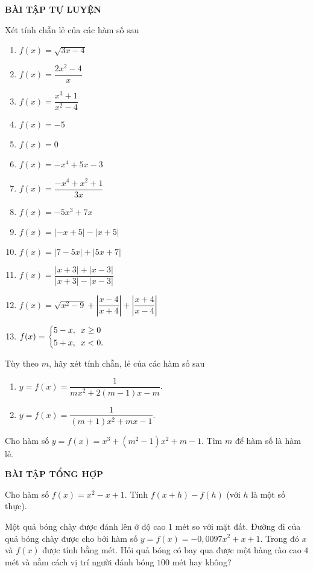 \begin{center}
	\textbf{BÀI TẬP TỰ LUYỆN}
\end{center}
\begin{bt}%
	Xét tính chẵn lẻ của các hàm số sau
	\begin{enumerate}
		\item $f(x)=\sqrt{3x-4}$
		\item $f(x)=\dfrac{2x^2-4}{x}$
		\item $f(x)=\dfrac{x^3+1}{x^2-4}$
		\item $f(x)=-5$
		\item $f(x)=0$
		\item $f(x)=-x^4+5x-3$
		\item $f(x)=\dfrac{-x^4+x^2+1}{3x}$
		\item $f(x)=-5x^3+7x$
		\item $f(x)=|-x+5|-|x+5|$
		\item $f(x)=|7-5x|+|5x+7|$
		\item $f(x)=\dfrac{|x+3|+|x-3|}{|x+3|-|x-3|}$
		\item $f(x)=\sqrt{x^2-9}+\left|\dfrac{x-4}{x+4} \right|+\left|\dfrac{x+4}{x-4}\right|$
		\item $f(x)=\left\{\begin{aligned} &5-x, \,\,\, x\ge 0 \\ &5+x, \,\,\, x<0.\end{aligned}\right.$
	\end{enumerate}
\end{bt}
\begin{bt}%
	Tùy theo $m$, hãy xét tính chẵn, lẻ của các hàm số sau
	\begin{enumerate}
		\item $y=f(x)=\dfrac{1}{mx^2+2(m-1)x-m}$.
		\item $y=f(x)=\dfrac{1}{(m+1)x^2+mx-1}$.
	\end{enumerate}
\end{bt}
\begin{bt}%
	Cho hàm số $y=f(x)=x^3+(m^2-1)x^2+m-1$. Tìm $m$ để hàm số là hàm lẻ.
\end{bt}

\begin{center}
	\textbf{BÀI TẬP TỔNG HỢP}
\end{center}

\begin{bt}%
	Cho hàm số $f(x)=x^2-x+1$.
	Tính $f(x+h)-f(h)$ (với $h$ là một số thực).
\end{bt}

\begin{bt}%
	Một quả bóng chày được đánh lên ở độ cao $1$ mét so với mặt đất. Đường đi của quả bóng chày được cho bởi hàm số $y=f(x)=-0,0097 x^2 + x + 1$. Trong đó $x$ và $f(x)$ được tính bằng mét. Hỏi quả bóng có bay qua được một hàng rào cao $4$ mét và nằm cách vị trí người đánh bóng $100$ mét hay không?
\end{bt}

